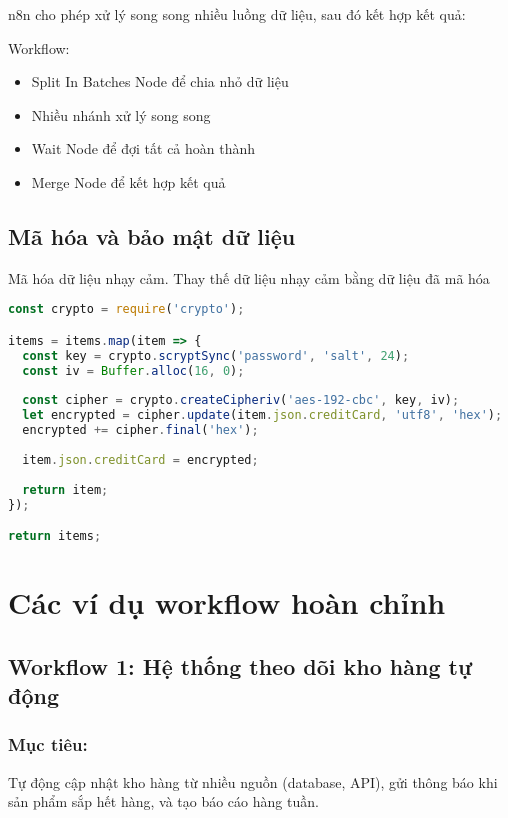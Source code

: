 n8n cho phép xử lý song song nhiều luồng dữ liệu, sau đó kết hợp kết quả:

Workflow:
\begin{itemize}
    \item Split In Batches Node để chia nhỏ dữ liệu
    \item Nhiều nhánh xử lý song song
    \item Wait Node để đợi tất cả hoàn thành
    \item Merge Node để kết hợp kết quả
\end{itemize}

\subsection{Mã hóa và bảo mật dữ liệu}
Mã hóa dữ liệu nhạy cảm. Thay thế dữ liệu nhạy cảm bằng dữ liệu đã mã hóa
\begin{lstlisting}[language=JavaScript]
const crypto = require('crypto');

items = items.map(item => {
  const key = crypto.scryptSync('password', 'salt', 24);
  const iv = Buffer.alloc(16, 0);
  
  const cipher = crypto.createCipheriv('aes-192-cbc', key, iv);
  let encrypted = cipher.update(item.json.creditCard, 'utf8', 'hex');
  encrypted += cipher.final('hex');
  
  item.json.creditCard = encrypted;
  
  return item;
});

return items;
\end{lstlisting}

\section{Các ví dụ workflow hoàn chỉnh}

\subsection{Workflow 1: Hệ thống theo dõi kho hàng tự động}

\subsubsection{Mục tiêu:} Tự động cập nhật kho hàng từ nhiều nguồn (database, API), gửi thông báo khi sản phẩm sắp hết hàng, và tạo báo cáo hàng tuần.

